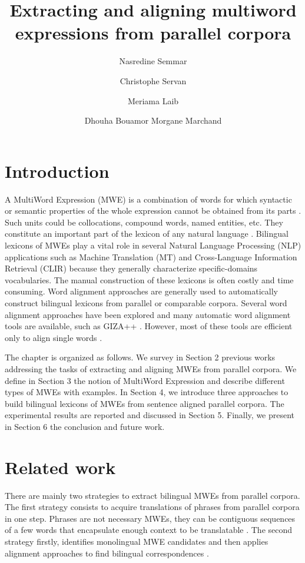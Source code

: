 \documentclass[output=paper,modfonts,nonflat]{langsci/langscibook}
\title{Extracting and aligning multiword expressions from parallel corpora}
\author{%
 Nasredine Semmar\affiliation{CEA LIST, Vision and Content Engineering Laboratory}\and 
 Christophe Servan\affiliation{University of Grenoble Alpes -- Grenoble Informatics Laboratory\\ SYSTRAN}\and
 Meriama Laib\affiliation{CEA LIST, Vision and Content Engineering Laboratory}\and
 Dhouha Bouamor\affiliation{Actimos, Groupe Accord}\lastand 
 Morgane Marchand\affiliation{eXenSa}
}
\begin{document}
\maketitle

\section{Introduction}

A MultiWord Expression (MWE) is a combination of words for which syntactic or semantic properties of the whole expression cannot be obtained from its parts \citep{sag02}. Such units could be collocations, compound words, named entities, etc. They constitute an important part of the lexicon of any natural language \citep{jackendoff1997architecture}. Bilingual lexicons of MWEs play a vital role in several Natural Language Processing (NLP) applications such as Machine Translation (MT) and Cross-Language Information Retrieval (CLIR) because they generally characterize specific-domains vocabularies. The manual construction of these lexicons is often costly and time consuming. Word alignment approaches are generally used to automatically construct bilingual lexicons from parallel or comparable corpora. Several word alignment approaches have been explored \citep{daille1994towards,blank2000terminology,barbu2004} and many automatic word alignment tools are available, such as GIZA++ \citep{och2000improved}. However, most of these tools are efficient only to align single words \citep{fraser2007measuring}.

The chapter is organized as follows. We survey in Section 2 previous works addressing the tasks of extracting and aligning MWEs from parallel corpora. We define in Section 3 the notion of MultiWord Expression and describe different types of MWEs with examples.  In Section 4, we introduce three approaches to build bilingual lexicons of MWEs from sentence aligned parallel corpora. The experimental results are reported and discussed in Section 5. Finally, we present in Section 6 the conclusion and future work.

\section{Related work}

There are mainly two strategies to extract bilingual MWEs from parallel corpora. The first strategy consists to acquire translations of phrases from parallel corpora in one step. Phrases are not necessary MWEs, they can be contiguous sequences of a few words that encapsulate enough context to be translatable \citep{denero2008complexity}. The second strategy firstly, identifies monolingual MWE candidates and then applies alignment approaches to find bilingual correspondences \citep{daille1994towards,blank2000terminology,gaussier2011modeles,barbu2004}. 
\end{document}
